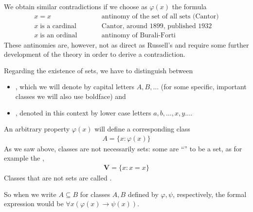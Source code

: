 \documentclass[letterpaper,10pt,english]{jupyterBook}
\begin{document}
\sphinxAtStartPar
We obtain similar contradictions if we choose as \(\varphi(x)\) the formula
\begin{eqnarray*}
     x = x  & & \text{antinomy of the set of all sets (Cantor)} \\
     x\;\text{is a cardinal} & &\text{Cantor, around 1899, published 1932}\\
     x \; \text{is an ordinal} & \qquad  & \text{antinomy of Burali-Forti}
\end{eqnarray*}
\sphinxAtStartPar
These antinomies are, however, not as direct as Russell’s and require some further development of the theory in order to derive a contradiction.

\sphinxAtStartPar
Regarding the existence of sets, we have to distinguish between
\begin{itemize}
\item {} 
\sphinxAtStartPar
{}, which we will denote by capital letters \(A,B,\dots\) (for some specific, important classes we will also use boldface) and

\item {} 
\sphinxAtStartPar
{}, denoted in this context by lower case letters \(a,b,\ldots,x,y \ldots\).

\end{itemize}

\sphinxAtStartPar
An arbitrary property \(\varphi(x)\) will define a corresponding class
\begin{equation*}
\begin{split}
A = \{x \colon \varphi(x)\}
\end{split}
\end{equation*}
\sphinxAtStartPar
As we saw above, classes are not necessarily sets: some are “” to be a set, as for example the ,
\begin{equation*}
\begin{split}
\mathbf{V} = \{ x \colon x = x \}
\end{split}
\end{equation*}
\sphinxAtStartPar
Classes that are not sets are called .

\begin{sphinxShadowBox}
\sphinxstylesidebartitle{}

\sphinxAtStartPar
So when we write \(A \subseteq B\) for classes \(A,B\) defined by \(\varphi, \psi\), respectively, the formal expression would be \(\forall x ( \varphi(x) \to \psi(x))\).
\end{sphinxShadowBox}
\end{document}

